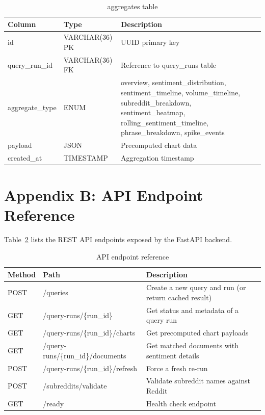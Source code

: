 \begin{table}[H]
\centering
\caption{aggregates table}
\label{tab:schema_aggregates}
\small
\begin{tabularx}{\textwidth}{ll>{\raggedright\arraybackslash}X}
\toprule
\textbf{Column} & \textbf{Type} & \textbf{Description} \\
\midrule
id & VARCHAR(36) PK & UUID primary key \\
query\_run\_id & VARCHAR(36) FK & Reference to query\_runs table \\
aggregate\_type & ENUM & overview, sentiment\_distribution, sentiment\_timeline, volume\_timeline, subreddit\_breakdown, sentiment\_heatmap, rolling\_sentiment\_timeline, phrase\_breakdown, spike\_events \\
payload & JSON & Precomputed chart data \\
created\_at & TIMESTAMP & Aggregation timestamp \\
\bottomrule
\end{tabularx}
\end{table}

\section*{Appendix B: API Endpoint Reference}

Table~\ref{tab:api_endpoints} lists the REST API endpoints exposed by the FastAPI backend.

\begin{table}[H]
\centering
\caption{API endpoint reference}
\label{tab:api_endpoints}
\small
\begin{tabularx}{\textwidth}{ll>{\raggedright\arraybackslash}X}
\toprule
\textbf{Method} & \textbf{Path} & \textbf{Description} \\
\midrule
POST & /queries & Create a new query and run (or return cached result) \\
GET & /query-runs/\{run\_id\} & Get status and metadata of a query run \\
GET & /query-runs/\{run\_id\}/charts & Get precomputed chart payloads \\
GET & /query-runs/\{run\_id\}/documents & Get matched documents with sentiment details \\
POST & /query-runs/\{run\_id\}/refresh & Force a fresh re-run \\
POST & /subreddits/validate & Validate subreddit names against Reddit \\
GET & /ready & Health check endpoint \\
\bottomrule
\end{tabularx}
\end{table}

